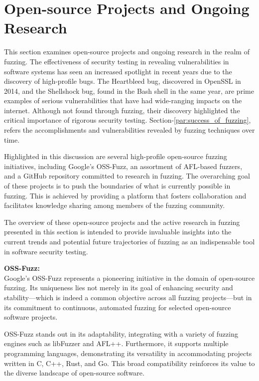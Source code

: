 \section{Open-source Projects and Ongoing Research}
This section examines open-source projects and ongoing research in
the realm of fuzzing. The effectiveness of security testing in
revealing vulnerabilities in software systems has seen an increased
spotlight in recent years due to the discovery of high-profile bugs.
The Heartbleed\cite{Heartble53:online} bug, discovered in OpenSSL in 2014,
and the Shellshock bug\cite{shetty2018shellshock},
found in the Bash shell in the same year, are prime examples of serious
vulnerabilities that have had wide-ranging impacts on the internet.
Although not found through fuzzing, their discovery highlighted the critical
importance of rigorous security testing. Section-\ref{par:success_of_fuzzing}, refers the accomplishments and
vulnerabilities revealed by fuzzing techniques over time.

Highlighted in this discussion are several high-profile open-source fuzzing initiatives,
including Google's OSS-Fuzz\cite{GitHubgo49:online}, an assortment of AFL-based fuzzers\cite{257204},
and a GitHub repository committed to research in fuzzing. The overarching goal
of these projects is to push the boundaries of what is currently possible in fuzzing.
This is achieved by providing a platform that fosters collaboration and facilitates
knowledge sharing among members of the fuzzing community.

The overview of these open-source projects and the active research in fuzzing
presented in this section is intended to provide invaluable insights into the
current trends and potential future trajectories of fuzzing as an indispensable
tool in software security testing.

\textbf{OSS-Fuzz:\cite{GitHubgo49:online}} \\
Google's OSS-Fuzz represents a pioneering initiative in the domain of open-source fuzzing.
Its uniqueness lies not merely in its goal of enhancing security and stability—which is indeed a
common objective across all fuzzing projects—but in its commitment to continuous,
automated fuzzing for selected open-source software projects.

OSS-Fuzz stands out in its adaptability, integrating with a variety of fuzzing engines such as
libFuzzer\cite{libFuzze17:online} and AFL++\cite{257204}.
Furthermore, it supports multiple programming languages, demonstrating its versatility in accommodating
projects written in C, C++, Rust, and Go. This broad compatibility reinforces its value to the diverse
landscape of open-source software\cite{ShortInt96:online}.

